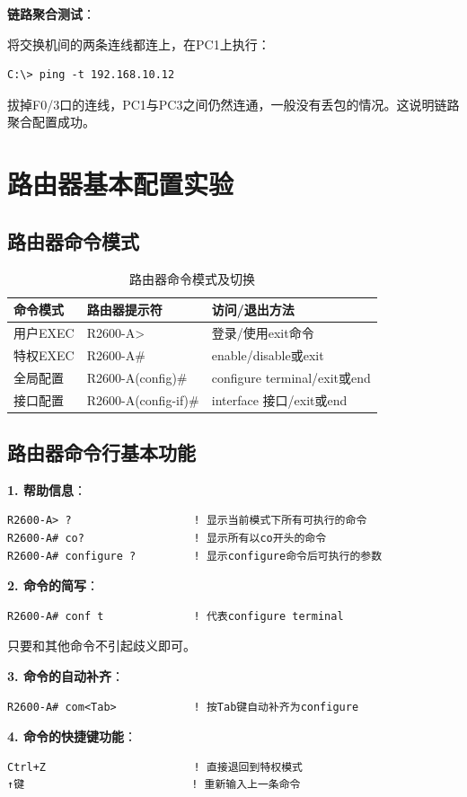 \documentclass[12pt,a4paper]{ctexart}
\begin{document}
\begin{keybox}
\textbf{链路聚合测试}：

将交换机间的两条连线都连上，在PC1上执行：
\begin{lstlisting}
C:\> ping -t 192.168.10.12
\end{lstlisting}

拔掉F0/3口的连线，PC1与PC3之间仍然连通，一般没有丢包的情况。这说明链路聚合配置成功。
\end{keybox}


\section{路由器基本配置实验}

\subsection{路由器命令模式}

\begin{table}[htbp]
\centering
\begin{tabular}{lll}
\toprule
\textbf{命令模式} & \textbf{路由器提示符} & \textbf{访问/退出方法} \\
\midrule
用户EXEC & R2600-A> & 登录/使用exit命令 \\
特权EXEC & R2600-A\# & enable/disable或exit \\
全局配置 & R2600-A(config)\# & configure terminal/exit或end \\
接口配置 & R2600-A(config-if)\# & interface 接口/exit或end \\
\bottomrule
\end{tabular}
\caption{路由器命令模式及切换}
\end{table}

\subsection{路由器命令行基本功能}

\begin{cmdbox}
\textbf{1. 帮助信息}：
\begin{lstlisting}
R2600-A> ?                   ! 显示当前模式下所有可执行的命令
R2600-A# co?                 ! 显示所有以co开头的命令
R2600-A# configure ?         ! 显示configure命令后可执行的参数
\end{lstlisting}

\textbf{2. 命令的简写}：
\begin{lstlisting}
R2600-A# conf t              ! 代表configure terminal
\end{lstlisting}
只要和其他命令不引起歧义即可。

\textbf{3. 命令的自动补齐}：
\begin{lstlisting}
R2600-A# com<Tab>            ! 按Tab键自动补齐为configure
\end{lstlisting}

\textbf{4. 命令的快捷键功能}：
\begin{lstlisting}
Ctrl+Z                       ! 直接退回到特权模式
↑键                          ! 重新输入上一条命令
\end{lstlisting}
\end{cmdbox}
\end{document}
